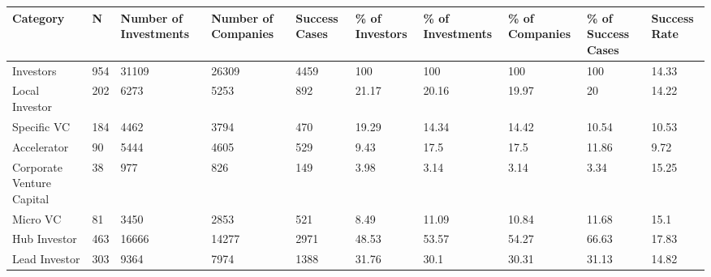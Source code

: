 \begin{tabular}{llllllllll}
  \toprule
Category & N & Number of Investments & Number of Companies & Success Cases & \% of Investors & \% of Investments & \% of Companies & \% of Success Cases & Success Rate \\ 
  \midrule
Investors & 954 & 31109 & 26309 & 4459 & 100 & 100 & 100 & 100 & 14.33 \\ 
  Local Investor & 202 & 6273 & 5253 & 892 & 21.17 & 20.16 & 19.97 & 20 & 14.22 \\ 
  Specific VC & 184 & 4462 & 3794 & 470 & 19.29 & 14.34 & 14.42 & 10.54 & 10.53 \\ 
  Accelerator & 90 & 5444 & 4605 & 529 & 9.43 & 17.5 & 17.5 & 11.86 & 9.72 \\ 
  Corporate Venture Capital & 38 & 977 & 826 & 149 & 3.98 & 3.14 & 3.14 & 3.34 & 15.25 \\ 
  Micro VC & 81 & 3450 & 2853 & 521 & 8.49 & 11.09 & 10.84 & 11.68 & 15.1 \\ 
  Hub Investor & 463 & 16666 & 14277 & 2971 & 48.53 & 53.57 & 54.27 & 66.63 & 17.83 \\ 
  Lead Investor & 303 & 9364 & 7974 & 1388 & 31.76 & 30.1 & 30.31 & 31.13 & 14.82 \\ 
   \bottomrule
\end{tabular}
